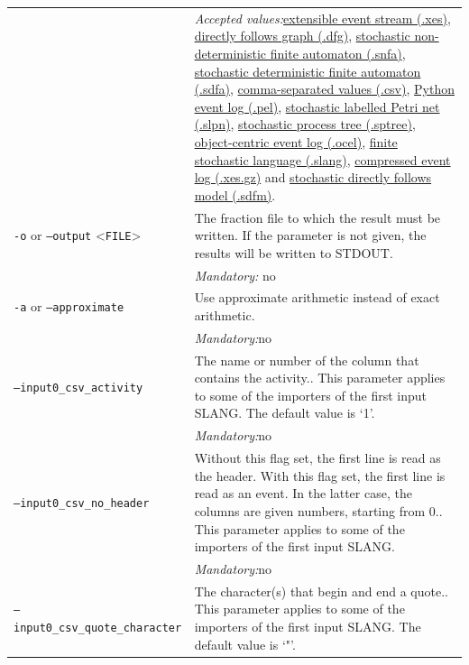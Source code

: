 {\begin{tabularx}{\linewidth}{lX}
&\textit{Accepted values:}\quad \hyperref[filehandler:extensible event stream]{extensible event stream (.xes)}, \hyperref[filehandler:directly follows graph]{directly follows graph (.dfg)}, \hyperref[filehandler:stochastic non-deterministic finite automaton]{stochastic non-deterministic finite automaton (.snfa)}, \hyperref[filehandler:stochastic deterministic finite automaton]{stochastic deterministic finite automaton (.sdfa)}, \hyperref[filehandler:comma-separated values]{comma-separated values (.csv)}, \hyperref[filehandler:Python event log]{Python event log (.pel)}, \hyperref[filehandler:stochastic labelled Petri net]{stochastic labelled Petri net (.slpn)}, \hyperref[filehandler:stochastic process tree]{stochastic process tree (.sptree)}, \hyperref[filehandler:object-centric event log]{object-centric event log (.ocel)}, \hyperref[filehandler:finite stochastic language]{finite stochastic language (.slang)}, \hyperref[filehandler:compressed event log]{compressed event log (.xes.gz)} and \hyperref[filehandler:stochastic directly follows model]{stochastic directly follows model (.sdfm)}.\\
\texttt{-o} or \texttt{--output} <\texttt{FILE}> &
The fraction file to which the result must be written. If the parameter is not given, the results will be written to STDOUT.\\
&\textit{Mandatory:} \quad no\\
\texttt{-a} or \texttt{--approximate} & Use approximate arithmetic instead of exact arithmetic.\\
&\textit{Mandatory:}\quad no\\
\texttt{--input0\_csv\_activity} & The name or number of the column that contains the activity.. This parameter applies to some of the importers of the first input SLANG. The default value is `1'.\\
&\textit{Mandatory:}\quad no\\
\texttt{--input0\_csv\_no\_header} & Without this flag set, the first line is read as the header. 
    With this flag set, the first line is read as an event. In the latter case, the columns are given numbers, starting from 0.. This parameter applies to some of the importers of the first input SLANG. \\
&\textit{Mandatory:}\quad no\\
\texttt{--input0\_csv\_quote\_character} & The character(s) that begin and end a quote.. This parameter applies to some of the importers of the first input SLANG. The default value is `"'.\\

\end{tabularx}}
